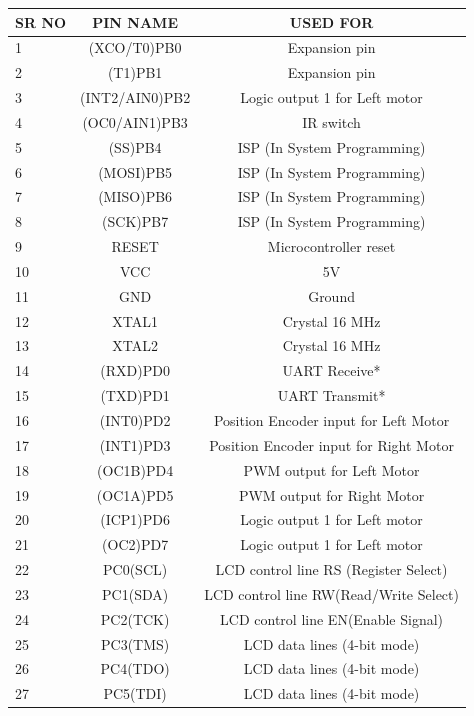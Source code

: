 \documentclass[a4paper,12pt,oneside]{book}
\begin{document}
\begin{tabular*}{\textwidth}{|l|c|c|}
	\hline
	SR NO & PIN NAME & USED FOR \\
	\hline
	1 & (XCO/T0)PB0 & Expansion pin\\
	\hline
	2 & (T1)PB1 & Expansion pin\\
	\hline
	3 & (INT2/AIN0)PB2 & Logic output 1 for Left motor\\
	\hline
	4 & (OC0/AIN1)PB3 & IR switch \\
	\hline
	5 & (SS)PB4 & ISP (In System Programming) \\
	\hline
	6 & (MOSI)PB5 & ISP (In System Programming) \\
	\hline
	7 & (MISO)PB6 & ISP (In System Programming) \\
	\hline
	8 & (SCK)PB7 & ISP (In System Programming) \\
	\hline
	9 & RESET & Microcontroller reset \\
	\hline
	10 & VCC & 5V \\
	\hline
	11 & GND & Ground \\
	\hline
	12 & XTAL1 & Crystal 16 MHz \\
	\hline
	13 & XTAL2 & Crystal 16 MHz \\
	\hline
	14 & (RXD)PD0 & UART Receive* \\
	\hline
	15 & (TXD)PD1 & UART Transmit* \\
	\hline
	16 & (INT0)PD2 & Position Encoder input for Left Motor \\
	\hline
	17 & (INT1)PD3 & Position Encoder input for Right Motor \\
	\hline
	18 & (OC1B)PD4 & PWM output for Left Motor \\
	\hline
	19 & (OC1A)PD5 & PWM output for Right Motor  \\
	\hline
	20 & (ICP1)PD6 & Logic output 1 for Left motor \\
	\hline
	21 & (OC2)PD7 & Logic output 1 for Left motor \\
	\hline
	22 & PC0(SCL) & LCD control line RS (Register Select) \\
	\hline
	23 & PC1(SDA) & LCD control line RW(Read/Write Select) \\
	\hline
	24 & PC2(TCK) & LCD control line EN(Enable Signal) \\
	\hline
	25 & PC3(TMS) & LCD data lines (4-bit mode) \\
	\hline
	26 & PC4(TDO) & LCD data lines (4-bit mode) \\
	\hline
	27 & PC5(TDI) & LCD data lines (4-bit mode) \\

\end{tabular*}
\end{document}
